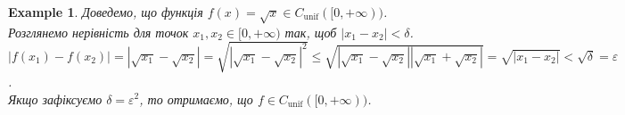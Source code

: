 \documentclass[a4paper, 14pt]{article}
\theoremstyle{theoremdd}
\theoremstyle{theoremdd}
\theoremstyle{theoremdd}
\theoremstyle{theoremdd}
\newtheorem{example}[theorem]{Example}
\theoremstyle{theoremdd}
\theoremstyle{theoremdd}
\theoremstyle{theoremdd}
\theoremstyle{theoremdd}
\begin{document}
\begin{example}
Доведемо, що функція $f(x) = \sqrt{x} \in C_{\text{unif}}([0,+\infty))$.\\
Розглянемо нерівність для точок $x_1,x_2 \in [0,+\infty)$ так, щоб $|x_1-x_2|<\delta$.\\
$|f(x_1) - f(x_2)| = |\sqrt{x_1} - \sqrt{x_2}| = \sqrt{|\sqrt{x_1} - \sqrt{x_2}|^2} \leq \sqrt{|\sqrt{x_1}-\sqrt{x_2}| |\sqrt{x_1}+\sqrt{x_2}|} = \sqrt{|x_1-x_2|} < \sqrt{\delta} = \varepsilon$.\\
Якщо зафіксуємо $\delta = \varepsilon^2$, то отримаємо, що $f \in C_{\text{unif}}([0,+\infty))$.
\\ %
\end{example}
\end{document}
